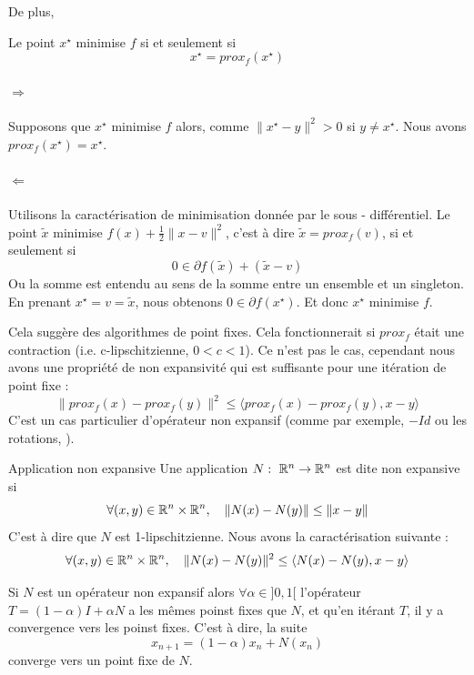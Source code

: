 \documentclass[a4paper,12pt]{article}
\begin{document}
De plus, 
\begin{propriete}
Le point $x^{\star}$ minimise $f$ si et seulement si 
$$
x^{\star} = prox_f(x^{\star})
$$
\end{propriete} 
\begin{preuve}
\vspace{-1cm}
\paragraph{$\Rightarrow$} Supposons que $x^{\star}$ minimise $f$ alors, comme $\|x^{\star}-y\|^2 > 0$ si $y\neq x^{\star}$. Nous avons $prox_f(x^{\star}) = x^{\star}$.
\paragraph{$\Leftarrow$} Utilisons la caractérisation de minimisation donnée par le sous - différentiel. Le point $\tilde{x}$ minimise $f(x) +\frac{1}{2}\|x-v\|^2$, c'est à dire $\tilde{x} = prox_f(v)$, si et seulement si 
$$
0\in \partial f(\tilde{x}) + (\tilde{x}-v)
$$
Ou la somme est entendu au sens de la somme entre un ensemble et un singleton. \\
En prenant $x^{\star} = v=\tilde{x}$, nous obtenons $0\in\partial f(x^{\star})$. Et donc $x^{\star}$ minimise $f$.
\end{preuve}

Cela suggère des algorithmes de point fixes. Cela fonctionnerait si $prox_f$ était une contraction (i.e. c-lipschitzienne, $0<c<1$). Ce n'est pas le cas, cependant nous avons une propriété de non expansivité qui est suffisante pour une itération de point fixe : 
$$
\|prox_f(x)-prox_f(y)\|^2\leq \langle prox_f(x)-prox_f(y),x-y\rangle
$$
C'est un cas particulier d'opérateur non expansif (comme par exemple, $-Id$ ou les rotations, \cite{browder1965nonexpansive,brezis1973ope}). 
\begin{definition}{Application non expansive}
Une application $N:\ \mathbb{R}^n\rightarrow \mathbb{R}^n$ est dite non expansive si 
$$
\forall (x,y)\in\mathbb{R}^n\times\mathbb{R}^n,\quad \|N(x)-N(y)\| \leq \|x-y\|
$$
C'est à dire que $N$ est 1-lipschitzienne. Nous avons la caractérisation suivante : 
$$
\forall (x,y)\in\mathbb{R}^n\times\mathbb{R}^n,\quad \|N(x)-N(y)\|^2 \leq  \langle N(x)-N(y),x-y\rangle
$$
\end{definition}

Si $N$ est un opérateur non expansif alors $\forall \alpha \in ]0,1[$ l'opérateur $T = (1-\alpha)I + \alpha N$ a les mêmes poinst fixes que $N$, et qu'en itérant $T$, il y a convergence vers les poinst fixes. C'est à dire, la suite 
$$
x_{n+1} = (1-\alpha )x_n +N(x_n)
$$
converge vers un point fixe de $N$.
\end{document}
